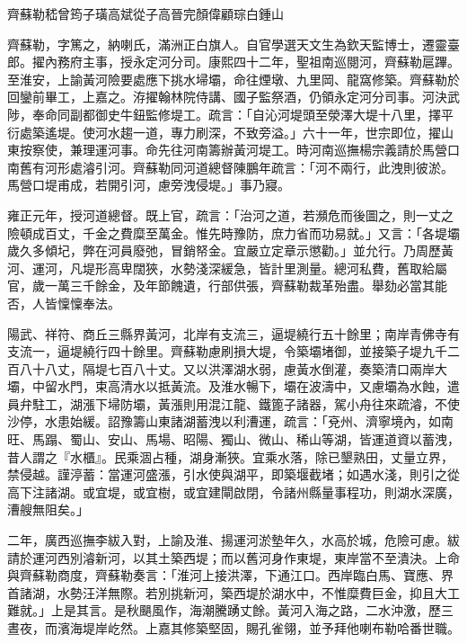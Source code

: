 
\begin{pinyinscope}
齊蘇勒嵇曾筠子璜高斌從子高晉完顏偉顧琮白鍾山

齊蘇勒，字篤之，納喇氏，滿洲正白旗人。自官學選天文生為欽天監博士，遷靈臺郎。擢內務府主事，授永定河分司。康熙四十二年，聖祖南巡閱河，齊蘇勒扈蹕。至淮安，上諭黃河險要處應下挑水埽壩，命往煙墩、九里岡、龍窩修築。齊蘇勒於回鑾前畢工，上嘉之。洊擢翰林院侍講、國子監祭酒，仍領永定河分司事。河決武陟，奉命同副都御史牛鈕監修堤工。疏言：「自沁河堤頭至滎澤大堤十八里，擇平衍處築遙堤。使河水趨一道，專力刷深，不致旁溢。」六十一年，世宗即位，擢山東按察使，兼理運河事。命先往河南籌辦黃河堤工。時河南巡撫楊宗義請於馬營口南舊有河形處濬引河。齊蘇勒同河道總督陳鵬年疏言：「河不兩行，此洩則彼淤。馬營口堤甫成，若開引河，慮旁洩侵堤。」事乃寢。

雍正元年，授河道總督。既上官，疏言：「治河之道，若瀕危而後圖之，則一丈之險頓成百丈，千金之費糜至萬金。惟先時豫防，庶力省而功易就。」又言：「各堤壩歲久多傾圮，弊在河員廢弛，冒銷帑金。宜嚴立定章示懲勸。」並允行。乃周歷黃河、運河，凡堤形高卑闊狹，水勢淺深緩急，皆計里測量。總河私費，舊取給屬官，歲一萬三千餘金，及年節餽遺，行部供張，齊蘇勒裁革殆盡。舉劾必當其能否，人皆懍懍奉法。

陽武、祥符、商丘三縣界黃河，北岸有支流三，逼堤繞行五十餘里；南岸青佛寺有支流一，逼堤繞行四十餘里。齊蘇勒慮刷損大堤，令築壩堵御，並接築子堤九千二百八十八丈，隔堤七百八十丈。又以洪澤湖水弱，慮黃水倒灌，奏築清口兩岸大壩，中留水門，束高清水以抵黃流。及淮水暢下，壩在波濤中，又慮壩為水蝕，遣員弁駐工，湖漲下埽防壩，黃漲則用混江龍、鐵篦子諸器，駕小舟往來疏濬，不使沙停，水患始緩。詔豫籌山東諸湖蓄洩以利漕運，疏言：「兗州、濟寧境內，如南旺、馬蹋、蜀山、安山、馬場、昭陽、獨山、微山、稀山等湖，皆運道資以蓄洩，昔人謂之『水櫃』。民乘涸占種，湖身漸狹。宜乘水落，除已墾熟田，丈量立界，禁侵越。謹渟蓄：當運河盛漲，引水使與湖平，即築堰截堵；如遇水淺，則引之從高下注諸湖。或宜堤，或宜樹，或宜建閘啟閉，令諸州縣量事程功，則湖水深廣，漕艘無阻矣。」

二年，廣西巡撫李紱入對，上諭及淮、揚運河淤墊年久，水高於城，危險可慮。紱請於運河西別濬新河，以其土築西堤；而以舊河身作東堤，東岸當不至潰決。上命與齊蘇勒商度，齊蘇勒奏言：「淮河上接洪澤，下通江口。西岸臨白馬、寶應、界首諸湖，水勢汪洋無際。若別挑新河，築西堤於湖水中，不惟糜費巨金，抑且大工難就。」上是其言。是秋颶風作，海潮騰踴丈餘。黃河入海之路，二水沖激，歷三晝夜，而濱海堤岸屹然。上嘉其修築堅固，賜孔雀翎，並予拜他喇布勒哈番世職。


\end{pinyinscope}
